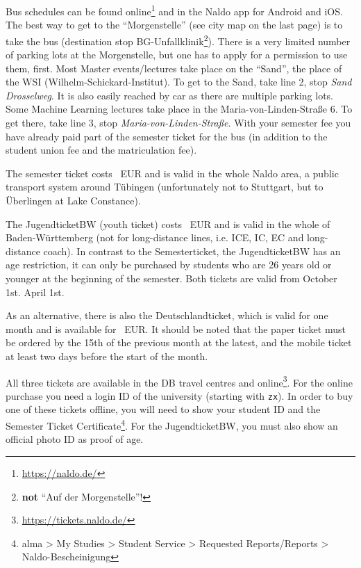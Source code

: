 \ifml
    Bus schedules can be found online\footnote{\url{https://naldo.de/}} and in the Naldo app for Android and iOS.\\
    The best way to get to the "`Morgenstelle"' (see city map on the last page) is to take the bus (destination stop BG-Unfallklinik\footnote{\textbf{not} "`Auf der Morgenstelle"'!}). There is a very limited number of parking lots at the Morgenstelle, but one has to apply for a permission to use them, first.
    Most Master events/lectures take place on the "`Sand"', the place of the WSI (Wilhelm-Schickard-Institut). To get to the Sand, take line 2, stop \emph{Sand Drosselweg}. It is also easily reached by car as there are multiple parking lots.
    Some Machine Learning lectures take place in the Maria-von-Linden-Straße 6. To get there, take line 3, stop \emph{Maria-von-Linden-Straße}.
    With your semester fee you have already paid part of the semester ticket for the bus (in addition to the student union fee and the matriculation fee).
    
    The semester ticket costs \semesterticketpreis~EUR and is valid in the whole Naldo area, a public transport system around
    Tübingen (unfortunately not to Stuttgart, but to Überlingen at Lake Constance).
    
    The JugendticketBW (youth ticket) costs \jugendticketbwpreis~EUR and is valid in the whole of Baden-Württemberg (not for long-distance lines, i.e. ICE, IC, EC and long-distance coach).
    In contrast to the Semesterticket, the JugendticketBW has an age restriction, it can only be purchased by students who are 26 years old or younger at the beginning of the semester.
    Both tickets are valid from
    \ifwintersemester
    October 1st.
    \fi
    \ifsommersemester
    April 1st.
    \fi

    As an alternative, there is also the Deutschlandticket, which is valid for one month and is available for \detickettuepreis~EUR. 
    It should be noted that the paper ticket must be ordered by the 15th of the previous month at the latest, and the mobile ticket at least two days before the start of the month.

    All three tickets are available in the DB travel centres and online\footnote{\url{https://tickets.naldo.de/}}. For the online purchase you need a login ID of the university (starting with \texttt{zx}).
    In order to buy one of these tickets offline, you will need to show your student ID and the Semester Ticket Certificate\footnote{alma > My Studies > Student Service > Requested Reports/Reports > Naldo-Bescheinigung}. For the JugendticketBW, you must also show an official photo ID as proof of age.\\
    
